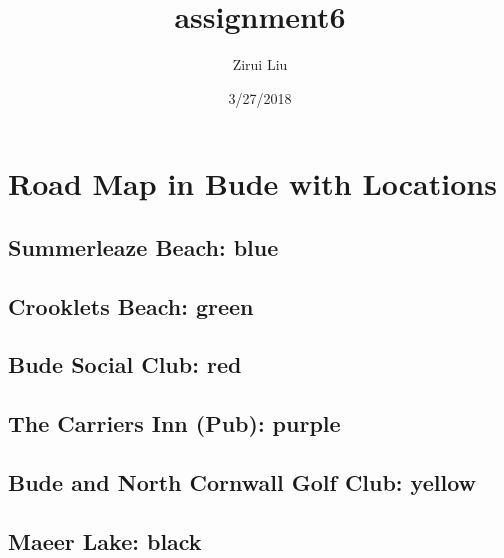 \documentclass[]{article}
\title{assignment6}
\author{Zirui Liu}
\date{3/27/2018}
\begin{document}
\maketitle

\section{Road Map in Bude with
Locations}\label{road-map-in-bude-with-locations}

\subsection{Summerleaze Beach: blue}\label{summerleaze-beach-blue}

\subsection{Crooklets Beach: green}\label{crooklets-beach-green}

\subsection{Bude Social Club: red}\label{bude-social-club-red}

\subsection{The Carriers Inn (Pub):
purple}\label{the-carriers-inn-pub-purple}

\subsection{Bude and North Cornwall Golf Club:
yellow}\label{bude-and-north-cornwall-golf-club-yellow}

\subsection{Maeer Lake: black}\label{maeer-lake-black}
\end{document}
